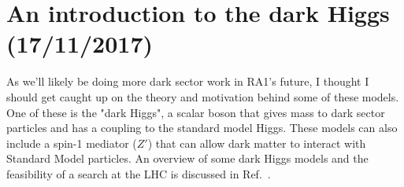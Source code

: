 
\chapter{An introduction to the dark Higgs (17/11/2017)}

As we'll likely be doing more dark sector work in RA1's future, I thought I should get caught up on the theory and motivation behind some of these models. One of these is the "dark Higgs", a scalar boson that gives mass to dark sector particles and has a coupling to the standard model Higgs. These models can also include a spin-1 mediator ($Z'$) that can allow dark matter to interact with Standard Model particles. An overview of some dark Higgs models and the feasibility of a search at the LHC is discussed in Ref.~\cite{Duerr:2017uap}.